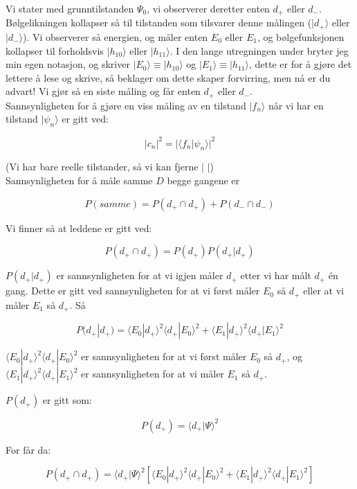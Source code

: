 \documentclass[a4paper,norsk, 10pt]{article}
\numberwithin{equation}{section}
\begin{document}
Vi stater med grunntilstanden $\Psi_0$, vi observerer deretter enten $d_+$ eller $d_-$. Bølgelikningen kollapser så til tilstanden som tilsvarer denne målingen ($|d_+\rangle$ eller $|d_-\rangle$). Vi observerer så energien, og måler enten $E_0$ eller $E_1$, og bølgefunksjonen kollapser til forholdsvis $|h_{10}\rangle$ eller $|h_{11}\rangle$. I den lange utregningen under bryter jeg min egen notasjon, og skriver $|E_0\rangle \equiv |h_{10}\rangle $ og $|E_1\rangle \equiv |h_{11}\rangle $, dette er for å gjøre det lettere å lese og skrive, så beklager om dette skaper forvirring, men nå er du advart! Vi gjør så en siste måling og får enten $d_+$ eller $d_-$.\\

Sannsynligheten for å gjøre en viss måling av en tilstand $| f_n\rangle$ når vi har en tilstand $|\psi_n\rangle$ er gitt ved:

$$
|c_n|^2 = |\langle f_n|\psi_n\rangle|^2
$$

(Vi har bare reelle tilstander, så vi kan fjerne $|$ $|$)\\

Sannsynligheten for å måle samme $D$ begge gangene er

\begin{equation}
P(samme) = P(d_+ \cap d_+) + P(d_- \cap d_-)
\label{eq:Psamme}
\end{equation}

Vi finner så at leddene er gitt ved:

$$
P(d_+ \cap d_+) = P(d_+)P(d_+|d_+)
$$

$P(d_+|d_+)$ er sannsynligheten for at vi igjen måler $d_+$ etter vi har målt $d_+$ én gang. Dette er gitt ved sannsynligheten for at vi først måler $E_0$ så $d_+$ eller at vi måler $E_1$ så $d_+$. Så

$$
P(d_+|d_+) = \langle E_0|d_+\rangle^2\langle d_+|E_0\rangle^2 + \langle E_1|d_+\rangle^2\langle d_+|E_1\rangle^2
$$

$\langle E_0|d_+\rangle^2\langle d_+|E_0\rangle^2$ er sannsynligheten for at vi først måler $E_0$ så $d_+$, og $\langle E_1|d_+\rangle^2\langle d_+|E_1\rangle^2$ er sannsynligheten for at vi måler $E_1$ så $d_+$. 

$P(d_+)$ er gitt som:

$$
P(d_+) = \langle d_+|\Psi\rangle^2
$$

For får da:

$$
P(d_+ \cap d_+) = \langle d_+|\Psi\rangle^2\left[\langle E_0|d_+\rangle^2\langle d_+|E_0\rangle^2 + \langle E_1|d_+\rangle^2\langle d_+|E_1\rangle^2\right]
$$
\end{document}
